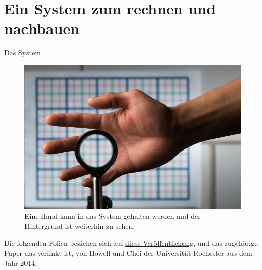 \section{Ein System zum rechnen und nachbauen}

\begin{frame}{Das System}
  \begin{figure}
    \caption{Eine Hand kann in das System gehalten werden und der Hintergrund ist weiterhin zu sehen.}
    \centering
    \includegraphics[height=0.6\textheight]{images/hand-cloak.jpg}
  \end{figure}
  Die folgenden Folien beziehen sich auf
  \href{https://www.rochester.edu/newscenter/watch-rochester-cloak-uses-ordinary-lenses-to-hide-objects-across-continuous-range-of-angles-70592/}{diese Veröffentlichung},
  und das zugeh\"orige Paper das verlinkt ist,
  von Howell und Choi der Universität Rochester aus dem Jahr 2014.
\end{frame}

